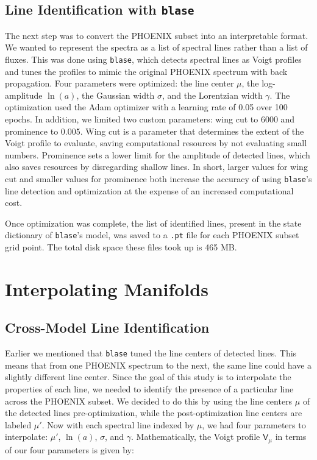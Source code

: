 \documentclass[twocolumn]{aastex631}
\begin{document}
\subsection{Line Identification with \texttt{blase}}
The next step was to convert the PHOENIX subset into an interpretable format.
We wanted to represent the spectra as a list of spectral lines rather than a
list of fluxes. This was done using \texttt{blase}, which detects spectral 
lines as Voigt profiles and tunes the profiles to mimic the original 
PHOENIX spectrum with back propagation. Four parameters were optimized: the 
line center $\mu$, the log-amplitude $\ln(a)$, the Gaussian width $\sigma$, and the 
Lorentzian width $\gamma$. The optimization used the Adam optimizer with a
learning rate of 0.05 over 100 epochs. In addition, we limited two custom 
parameters: wing cut to 6000 and prominence to 0.005. Wing cut is a parameter
that determines the extent of the Voigt profile to evaluate, saving
computational resources by not evaluating small numbers. Prominence sets a
lower limit for the amplitude of detected lines, which also saves resources 
by disregarding shallow lines. In short, larger values for wing cut and 
smaller values for prominence both increase the accuracy of using
\texttt{blase}'s line detection and optimization at the expense of an
increased computational cost.

Once optimization was complete, the list of identified lines, present in the
state dictionary of \texttt{blase}'s model, was saved to a \texttt{.pt} file
for each PHOENIX subset grid point. The total disk space these files took up 
is 465 MB.

\section{Interpolating Manifolds}
\subsection{Cross-Model Line Identification}
Earlier we mentioned that \texttt{blase} tuned the line centers of
detected lines. This means that from one PHOENIX spectrum to the next, the
same line could have a slightly different line center. Since the goal of this
study is to interpolate the properties of each line, we needed to identify the
presence of a particular line across the PHOENIX subset. We decided to do
this by using the line centers $\mu$ of the detected lines pre-optimization, 
while the post-optimization line centers are labeled $\mu'$. Now with 
each spectral line indexed by $\mu$, we had four parameters to interpolate:
$\mu'$, $\ln(a)$, $\sigma$, and $\gamma$. Mathematically, the Voigt profile
$\mathsf{V}_\mu$ in terms of our four parameters is given by:
\end{document}
